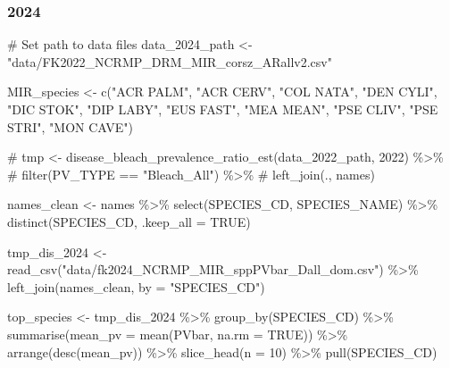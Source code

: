 \documentclass[
]{article}
\newenvironment{Shaded}{\begin{snugshade}}{\end{snugshade}}
\newcommand{\AttributeTok}[1]{\textcolor[rgb]{0.40,0.45,0.13}{#1}}
\newcommand{\CommentTok}[1]{\textcolor[rgb]{0.37,0.37,0.37}{#1}}
\newcommand{\ConstantTok}[1]{\textcolor[rgb]{0.56,0.35,0.01}{#1}}
\newcommand{\DecValTok}[1]{\textcolor[rgb]{0.68,0.00,0.00}{#1}}
\newcommand{\FunctionTok}[1]{\textcolor[rgb]{0.28,0.35,0.67}{#1}}
\newcommand{\NormalTok}[1]{\textcolor[rgb]{0.00,0.23,0.31}{#1}}
\newcommand{\OtherTok}[1]{\textcolor[rgb]{0.00,0.23,0.31}{#1}}
\newcommand{\SpecialCharTok}[1]{\textcolor[rgb]{0.37,0.37,0.37}{#1}}
\newcommand{\StringTok}[1]{\textcolor[rgb]{0.13,0.47,0.30}{#1}}
\begin{document}
\hypertarget{section-3}{%
\subsubsection{2024}\label{section-3}}

\begin{Shaded}
\begin{Highlighting}[]
\CommentTok{\# Set path to data files}
\NormalTok{data\_2024\_path }\OtherTok{\textless{}{-}} \StringTok{"data/FK2022\_NCRMP\_DRM\_MIR\_corsz\_ARallv2.csv"}


\NormalTok{MIR\_species }\OtherTok{\textless{}{-}} \FunctionTok{c}\NormalTok{(}\StringTok{"ACR PALM"}\NormalTok{, }\StringTok{"ACR CERV"}\NormalTok{, }\StringTok{"COL NATA"}\NormalTok{, }\StringTok{"DEN CYLI"}\NormalTok{, }\StringTok{"DIC STOK"}\NormalTok{, }\StringTok{"DIP LABY"}\NormalTok{, }\StringTok{"EUS FAST"}\NormalTok{, }\StringTok{"MEA MEAN"}\NormalTok{, }\StringTok{"PSE CLIV"}\NormalTok{, }\StringTok{"PSE STRI"}\NormalTok{, }\StringTok{"MON CAVE"}\NormalTok{)}

\CommentTok{\# tmp \textless{}{-} disease\_bleach\_prevalence\_ratio\_est(data\_2022\_path, 2022) \%\textgreater{}\%}
\CommentTok{\#   filter(PV\_TYPE == "Bleach\_All") \%\textgreater{}\%}
\CommentTok{\#   left\_join(., names)}

\NormalTok{names\_clean }\OtherTok{\textless{}{-}}\NormalTok{ names }\SpecialCharTok{\%\textgreater{}\%}
  \FunctionTok{select}\NormalTok{(SPECIES\_CD, SPECIES\_NAME) }\SpecialCharTok{\%\textgreater{}\%}
  \FunctionTok{distinct}\NormalTok{(SPECIES\_CD, }\AttributeTok{.keep\_all =} \ConstantTok{TRUE}\NormalTok{)}

\NormalTok{tmp\_dis\_2024 }\OtherTok{\textless{}{-}} \FunctionTok{read\_csv}\NormalTok{(}\StringTok{"data/fk2024\_NCRMP\_MIR\_sppPVbar\_Dall\_dom.csv"}\NormalTok{) }\SpecialCharTok{\%\textgreater{}\%}
    \FunctionTok{left\_join}\NormalTok{(names\_clean, }\AttributeTok{by =} \StringTok{"SPECIES\_CD"}\NormalTok{)}


\NormalTok{top\_species }\OtherTok{\textless{}{-}}\NormalTok{ tmp\_dis\_2024 }\SpecialCharTok{\%\textgreater{}\%}
  \FunctionTok{group\_by}\NormalTok{(SPECIES\_CD) }\SpecialCharTok{\%\textgreater{}\%}
  \FunctionTok{summarise}\NormalTok{(}\AttributeTok{mean\_pv =} \FunctionTok{mean}\NormalTok{(PVbar, }\AttributeTok{na.rm =} \ConstantTok{TRUE}\NormalTok{)) }\SpecialCharTok{\%\textgreater{}\%}
  \FunctionTok{arrange}\NormalTok{(}\FunctionTok{desc}\NormalTok{(mean\_pv)) }\SpecialCharTok{\%\textgreater{}\%}
  \FunctionTok{slice\_head}\NormalTok{(}\AttributeTok{n =} \DecValTok{10}\NormalTok{) }\SpecialCharTok{\%\textgreater{}\%}  
  \FunctionTok{pull}\NormalTok{(SPECIES\_CD)}


\end{Highlighting}
\end{Shaded}
\end{document}
